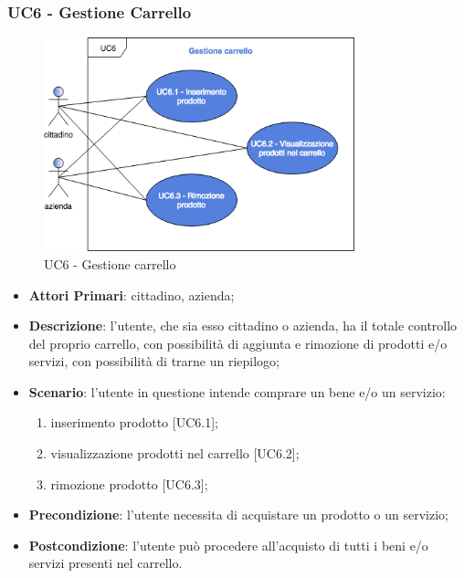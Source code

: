 \subsubsection{UC6 - Gestione Carrello}
 \begin{figure}[h]
	\includegraphics[width=9cm]{res/images/UC6GestioneCarrello.png}
	\centering
	\caption{UC6 - Gestione carrello}
\end{figure}
\begin{itemize}
	\item \textbf{Attori Primari}: cittadino, azienda\glo;
	\item \textbf{Descrizione}: l'utente, che sia esso cittadino o azienda, ha il totale controllo del proprio carrello, con possibilità di aggiunta e rimozione di prodotti e/o servizi, con possibilità di trarne un riepilogo;
	\item \textbf{Scenario}: l'utente in questione intende comprare un bene e/o un servizio:
	 \begin{enumerate}[label=\alph*.]
		\item inserimento prodotto [UC6.1];
		\item visualizzazione prodotti nel carrello [UC6.2];
		\item rimozione prodotto [UC6.3];
	\end{enumerate}
	\item \textbf{Precondizione}: l'utente necessita di acquistare un prodotto o un servizio;
	\item \textbf{Postcondizione}: l'utente può procedere all'acquisto di tutti i beni e/o servizi presenti nel carrello.
\end{itemize} 
